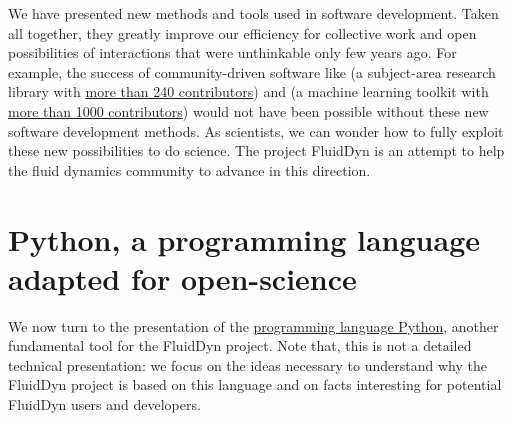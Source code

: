 
We have presented new methods and tools used in software development.  Taken
all together, they greatly improve our efficiency for collective work and open
possibilities of interactions that were unthinkable only few years ago.
%
For example, the success of community-driven software like  (a
subject-area research library with \href{https://github.com/astropy/astropy}{more
than 240 contributors}) and  (a machine learning toolkit with
\href{https://github.com/scikit-learn/scikit-learn}{more than 1000 contributors})
would not have been possible without these new software development methods.
%
%
As scientists, we can wonder how to fully exploit these new possibilities to do
science.  The project FluidDyn is an attempt to help the fluid dynamics community
to advance in this direction.



\section{Python, a programming language adapted for open-science}

We now turn to the presentation of the
\href{https://www.python.org/}{programming language Python}, another
fundamental tool for the FluidDyn project.  Note that, this is not a detailed
technical presentation: we focus on the ideas necessary to understand why the
FluidDyn project is based on this language and on facts interesting for
potential FluidDyn users and developers.

